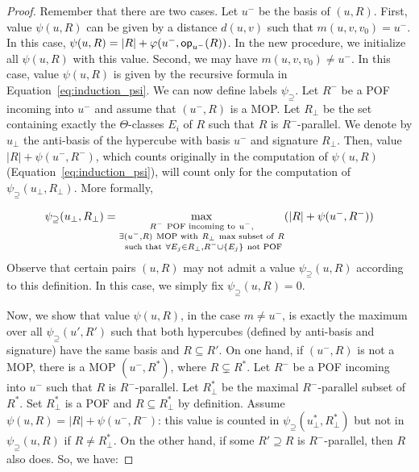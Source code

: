 \documentclass[a4paper,UKenglish,numberwithinsect,cleveref, autoref]{lipics-v2021}
\newcommand{\set}[1]{\left\{ #1 \right\}}
\newcommand{\card}[1]{\left| #1 \right|}
\newcommand{\opp}{\mbox{\textsf{op}}}
\newcommand{\psis}{\psi_{\supseteq}}
\begin{document}
\begin{proof}
Remember that there are two cases. Let $u^-$ be the basis of $(u,R)$. First, value $\psi(u,R)$ can be given by a distance $d(u,v)$ such that $m(u,v,v_0) = u^-$. In this case, $\psi(u,R) = \card{R} + \varphi(u^-,\opp_{u^-}(R))$. In the new procedure, we initialize all $\psi(u,R)$ with this value. Second, we may have $m(u,v,v_0) \neq u^-$. In this case, value $\psi(u,R)$ is given by the recursive formula in Equation~\eqref{eq:induction_psi}. We can now define labels $\psis$. Let $R^-$ be a POF incoming into $u^-$ and assume that $(u^-,R)$ is a MOP. Let $R_{\perp}$ be the set containing exactly the $\Theta$-classes $E_i$ of $R$ such that $R$ is $R^-$-parallel. We denote by $u_{\perp}$ the anti-basis of the hypercube with basis $u^-$ and signature $R_{\perp}$. Then, value $\card{R} + \psi(u^-,R^-)$, which counts originally in the computation of $\psi(u,R)$ (Equation~\eqref{eq:induction_psi}), will count only for the computation of $\psis(u_{\perp},R_{\perp})$. More formally,

\begin{equation}
    \psis(u_{\perp},R_{\perp}) = \max\limits_{\substack{R^- ~\mbox{\scriptsize{POF incoming to}}~ u^-, \\ \exists (u^-,R) ~\mbox{\scriptsize{MOP with}}~ R_{\perp} ~\mbox{\scriptsize{max subset of}}~ R\\ ~\mbox{\scriptsize{such that}}~ \forall E_j \in R_{\perp}, R^- \cup \set{E_j} ~\mbox{\scriptsize{not POF}}}} (\card{R} + \psi(u^-,R^-))
    \label{eq:induction_psi_mop}
\end{equation}
Observe that certain pairs $(u,R)$ may not admit a value $\psis(u,R)$ according to this definition. In this case, we simply fix $\psis(u,R) = 0$.

Now, we show that value $\psi(u,R)$, in the case $m\neq u^-$, is exactly the maximum over all $\psis(u',R')$ such that both hypercubes (defined by anti-basis and signature) have the same basis and $R \subseteq R'$. On one hand, if $(u^-,R)$ is not a MOP, there is a MOP $(u^-,R^*)$, where $R \subsetneq R^*$. Let $R^-$ be a POF incoming into $u^-$ such that $R$ is $R^-$-parallel. Let $R_{\perp}^*$ be the maximal $R^-$-parallel subset of $R^*$. Set $R_{\perp}^*$ is a POF and $R \subseteq R_{\perp}^*$ by definition. Assume $\psi(u,R) = \card{R} + \psi(u^-,R^-)$: this value is counted in $\psis(u_{\perp}^*,R_{\perp}^*)$ but not in $\psis(u,R)$ if $R\neq R_{\perp}^*$. On the other hand, if some $R' \supseteq R$ is $R^-$-parallel, then $R$ also does. So, we have:


\end{proof}
\end{document}
